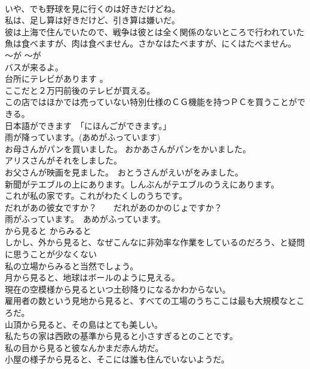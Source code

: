 \documentclass[8pt]{extreport}
\begin{document}
\begin{CJK}{UTF8}{min}
\\	いや、でも野球を見に行くのは好きだけどね。  
\\	私は、足し算は好きだけど、引き算は嫌いだ。  
\\	彼は上海で住んでいたので、戦争は彼とは全く関係のないところで行われていた
\\	魚は食べますが、肉は食べません。さかなはたべますが、にくはたべません。  
\\	〜が	〜が	
\\	バスが来るよ。 
\\	台所にテレビがあります 。
\\	ここだと２万円前後のテレビが買える。
\\	この店ではほかでは売っていない特別仕様のＣＧ機能を持つＰＣを買うことができる。  
\\	日本語ができます　「にほんごができます。」  
\\	雨が降っています。(あめがふっています)   
\\	お母さんがパンを買いました。 おかあさんがパンをかいました。   
\\	アリスさんがそれをしました。   
\\	お父さんが映画を見ました。　おとうさんがえいがをみました。   
\\	新聞がテエブルの上にあります。しんぶんがテエブルのうえにあります。   
\\	これが私の家です。これがわたくしのうちです。   
\\	だれがあの彼女ですか？　　だれがあのかのじょですか？   
\\	雨がふっています。　あめがふっています。  
\\	から見ると	からみると	
\\	しかし、外から見ると、なぜこんなに非効率な作業をしているのだろう、と疑問に思うことが少なくない  
\\	私の立場からみると当然でしょう。  
\\	月から見ると、地球はボールのように見える。   
\\	現在の空模様から見るといつ土砂降りになるかわからない。   
\\	雇用者の数という見地から見ると、すべての工場のうちここは最も大規模なところだ。   
\\	山頂から見ると、その島はとても美しい。  
\\	私たちの家は西欧の基準から見ると小さすぎるとのことです。   
\\	私の目から見ると彼なんかまだ赤ん坊だ。   
\\	小屋の様子から見ると、そこには誰も住んでいないようだ。   

\end{CJK}
\end{document}
